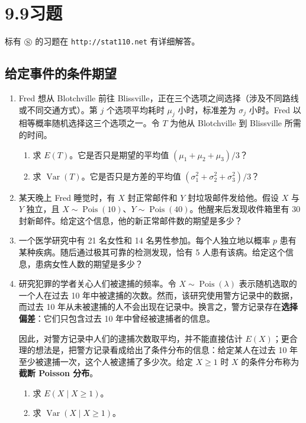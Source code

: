 \documentclass[UTF8,12pt,a4paper,fontset=fandol]{ctexart}
\begin{document}
\section*{9.9\quad 习题}

标有 $\circledS$ 的习题在 \texttt{http://stat110.net} 有详细解答。

\subsection*{给定事件的条件期望}

\begin{enumerate}
  \item Fred 想从 Blotchville 前往 Blissville，正在三个选项之间选择（涉及不同路线或不同交通方式）。第 $j$ 个选项平均耗时 $\mu_j$ 小时，标准差为 $\sigma_j$ 小时。Fred 以相等概率随机选择这三个选项之一。令 $T$ 为他从 Blotchville 到 Blissville 所需的时间。
  \begin{enumerate}
    \item[(a)] 求 $E(T)$。它是否只是期望的平均值 $(\mu_1+\mu_2+\mu_3)/3$？
    \item[(b)] 求 $\operatorname{Var}(T)$。它是否只是方差的平均值 $(\sigma_1^2+\sigma_2^2+\sigma_3^2)/3$？
  \end{enumerate}

  \item 某天晚上 Fred 睡觉时，有 $X$ 封正常邮件和 $Y$ 封垃圾邮件发给他。假设 $X$ 与 $Y$ 独立，且 $X\sim\operatorname{Pois}(10)$、$Y\sim\operatorname{Pois}(40)$。他醒来后发现收件箱里有 30 封新邮件。给定这个信息，他的新正常邮件数的期望是多少？

  \item 一个医学研究中有 21 名女性和 14 名男性参加。每个人独立地以概率 $p$ 患有某种疾病。随后通过极其可靠的检测发现，恰有 5 人患有该病。给定这个信息，患病女性人数的期望是多少？

  \item 研究犯罪的学者关心人们被逮捕的频率。令 $X\sim\operatorname{Pois}(\lambda)$ 表示随机选取的一个人在过去 10 年中被逮捕的次数。然而，该研究使用警方记录中的数据，而过去 10 年从未被逮捕的人不会出现在记录中。换言之，警方记录存在\textbf{选择偏差}：它们只包含过去 10 年中曾经被逮捕者的信息。

  因此，对警方记录中人们的逮捕次数取平均，并不能直接估计 $E(X)$；更合理的想法是，把警方记录看成给出了条件分布的信息：给定某人在过去 10 年至少被逮捕一次，这个人被逮捕了多少次。给定 $X\ge1$ 时 $X$ 的条件分布称为\textbf{截断 Poisson 分布}。
  \begin{enumerate}
    \item[(a)] 求 $E(X\mid X\ge1)$。
    \item[(b)] 求 $\operatorname{Var}(X\mid X\ge1)$。
  \end{enumerate}


\end{enumerate}
\end{document}
